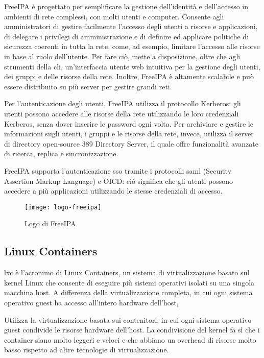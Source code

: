 FreeIPA è progettato per semplificare la gestione dell'identità e dell'accesso in ambienti di rete complessi, con molti utenti e computer. Consente agli amministratori di gestire facilmente l'accesso degli utenti a risorse e applicazioni, di delegare i privilegi di amministrazione e di definire ed applicare politiche di sicurezza coerenti in tutta la rete, come, ad esempio, limitare l'accesso alle risorse in base al ruolo dell'utente. Per fare ciò, mette a disposizione, oltre che agli strumenti della \acrshort{cli}, un'interfaccia utente web intuitiva per la gestione degli utenti, dei gruppi e delle risorse della rete. Inoltre, FreeIPA è altamente scalabile e può essere distribuito su più server per gestire grandi reti.

Per l'autenticazione degli utenti, FreeIPA utilizza il protocollo Kerberos: gli utenti possono accedere alle risorse della rete utilizzando le loro credenziali Kerberos, senza dover inserire le password ogni volta.
Per archiviare e gestire le informazioni sugli utenti, i gruppi e le risorse della rete, invece, utilizza il server di directory open-source 389 Directory Server, il quale offre funzionalità avanzate di ricerca, replica e sincronizzazione.

FreeIPA supporta l'autenticazione \acrshort{sso} tramite i protocolli \acrfull{saml} (Security Assertion Markup Language) e OICD: ciò significa che gli utenti possono accedere a più applicazioni utilizzando le stesse credenziali di accesso.
\begin{figure}[H] 
    \centering 
    \texttt{[image: logo-freeipa]} 
    \caption{Logo di FreeIPA}
    \label{fig:logo-freeipa}
\end{figure}

\subsection{Linux Containers}
\acrshort{lxc} è l'acronimo di Linux Containers, un sistema di virtualizzazione basato sul kernel Linux che consente di eseguire più sistemi operativi isolati su una singola macchina host. A differenza della virtualizzazione completa, in cui ogni sistema operativo guest ha accesso all'intero hardware dell'host, 

Utilizza la virtualizzazione basata sui contenitori, in cui ogni sistema operativo guest condivide le risorse hardware dell'host.
La condivisione del kernel fa sì che i container siano molto leggeri e veloci e che abbiano un overhead di risorse molto basso rispetto ad altre tecnologie di virtualizzazione.


